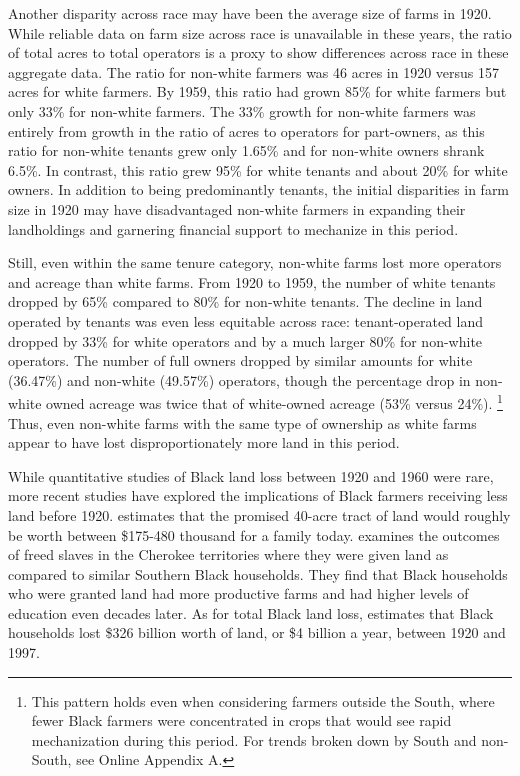 \documentclass[12pt]{article}
\begin{document}
Another disparity across race may have been the average size of farms in 1920. 
While reliable data on farm size across race is unavailable in these years, the ratio of total acres to total operators is a proxy to show differences across race in these aggregate data. 
The ratio for non-white farmers was 46 acres in 1920 versus 157 acres for white farmers. 
By 1959, this ratio had grown 85\% for white farmers but only 33\% for non-white farmers. 
The 33\% growth for non-white farmers was entirely from growth in the ratio of acres to operators for part-owners, as this ratio for non-white tenants grew only 1.65\% and for non-white owners shrank 6.5\%. 
In contrast, this ratio grew 95\% for white tenants and about 20\% for white owners. 
In addition to being predominantly tenants, the initial disparities in farm size in 1920 may have disadvantaged non-white farmers in expanding their landholdings and garnering financial support to mechanize in this period.

Still, even within the same tenure category, non-white farms lost more operators and acreage than white farms.
From 1920 to 1959, the number of white tenants dropped by 65\% compared to 80\% for non-white tenants. 
The decline in land operated by tenants was even less equitable across race: tenant-operated land dropped by 33\% for white operators and by a much larger 80\% for non-white operators. 
The number of full owners dropped by similar amounts for white (36.47\%) and non-white (49.57\%) operators, though the percentage drop in non-white owned acreage was twice that of white-owned acreage (53\% versus 24\%). \footnote{This pattern holds even when considering farmers outside the South, where fewer Black farmers were concentrated in crops that would see rapid mechanization during this period. For trends broken down by South and non-South, see Online Appendix A.}
Thus, even non-white farms with the same type of ownership as white farms appear to have lost disproportionately more land in this period. 

While quantitative studies of Black land loss between 1920 and 1960 were rare, more recent studies have explored the implications of Black farmers receiving less land before 1920.
\citet{darity_jr_reconsidering_2023} estimates that the promised 40-acre tract of land would roughly be worth between \$175-480 thousand for a family today. 
\citet{miller_righteous_2020} examines the outcomes of freed slaves in the Cherokee territories where they were given land as compared to similar Southern Black households. 
They find that Black households who were granted land had more productive farms and had higher levels of education even decades later.
As for total Black land loss, \citet{francis_black_2022} estimates that Black households lost \$326 billion worth of land, or \$4 billion a year, between 1920 and 1997. 
\end{document}
